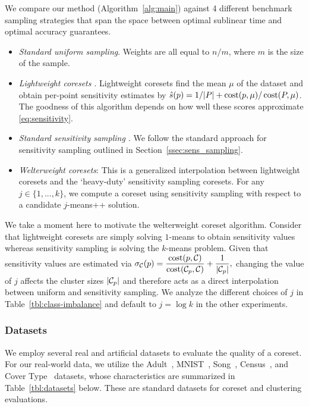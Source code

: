 We compare our method (Algorithm~\ref{alg:main}) against 4 different benchmark sampling strategies that span the space between optimal sublinear time and
optimal accuracy guarantees.
\begin{itemize}
        \item \emph{Standard uniform sampling}. Weights are all equal to $n / m$, where $m$ is the size of the sample.
        \item \emph{Lightweight coresets \cite{bachem2018scalable}}. Lightweight coresets find the mean $\mu$ of the dataset and obtain per-point sensitivity estimates by $\hat{s}(p) = 1/|P| + \operatorname{cost}(p, \mu) / \operatorname{cost}(P, \mu)$. The goodness of this algorithm depends on how well these scores approximate \cref{eq:sensitivity}.
        \item \emph{Standard sensitivity sampling \cite{LS10}}. We follow the standard approach for sensitivity sampling outlined in Section~\ref{ssec:sens_sampling}.
        \item \emph{Welterweight coresets}: This is a generalized interpolation between lightweight coresets and the `heavy-duty' sensitivity sampling coresets. For any $j
            \in \{1,..., k\}$, we compute a coreset using sensitivity sampling with respect to a candidate $j$-means++ solution.
\end{itemize}

We take a moment here to motivate the welterweight coreset algorithm.  Consider that lightweight coresets are simply solving $1$-means to obtain sensitivity
values whereas sensitivity sampling is solving the $k$-means problem. Given that sensitivity values are estimated via $ \sigma_\mathcal C(p) = \dfrac{\operatorname{cost}(p,
\mathcal C)}{\operatorname{cost}(\mathcal C_{p}, \mathcal C)} + \dfrac{1}{|\mathcal C_p|},$ changing the value of $j$ affects the cluster sizes $|\mathcal C_p|$ and therefore acts as a direct
interpolation between uniform and sensitivity sampling.  We analyze the different choices of $j$ in Table~\ref{tbl:class-imbalance} and default to $j = \log k$
in the other experiments.

\subsubsection{Datasets}
\label{sssec:datasets}

We employ several real and artificial datasets to evaluate the quality of a coreset.  For our real-world data, we utilize the Adult~\cite{Dua:2019},
MNIST~\cite{mnist}, Song~\cite{song}, Census~\cite{census}, and Cover Type~\cite{covtype} datasets, whose characteristics are summarized in
Table~\ref{tbl:datasets} below. These are standard datasets for coreset and clustering evaluations.


